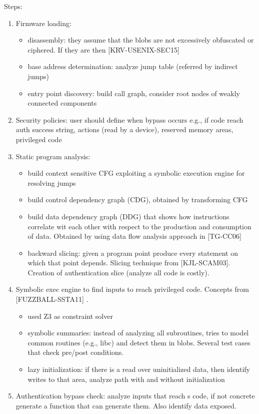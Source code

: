 \documentclass[10pt, a4paper]{article}
\begin{document}
Steps:
\begin{enumerate}
  \item Firmware loading: 
    \begin{itemize}
      \item disassembly: they assume that the blobs are not excessively obfuscated or ciphered. If they are then [KRV-USENIX-SEC15]
      \item base address determination: analyze jump table (referred by indirect jumps)
      \item entry point discovery: build call graph, consider root nodes of weakly connected components
    \end{itemize}
  \item Security policies: user should define when bypass occurs e.g., if code reach auth success string, actions (read by a device), reserved memory areas, privileged code
  \item Static program analysis:
    \begin{itemize}
      \item build context sensitive CFG exploiting a symbolic execution engine for resolving jumps
      \item build control dependency graph (CDG), obtained by transforming CFG
      \item build data dependency graph (DDG) that shows how instructions correlate wit each other with respect to the production and consumption of data. Obtained by using data flow analysis approach in [TG-CC06]
      \item backward slicing: given a program point produce every statement on which that point depends. Slicing technique from [KJL-SCAM03]. Creation of authentication slice (analyze all code is costly).
    \end{itemize}
  \item Symbolic exec engine to find inputs to reach privileged code. Concepts from~\cite{KLEE-OSDI08} [FUZZBALL-SSTA11] \cite{MAYHEM-SP12}.
    \begin{itemize}
      \item used Z3 as constraint solver
      \item symbolic summaries: instead of analyzing all subroutines, tries to model common routines (e.g., libc) and detect them in blobs. Several test cases that check pre/post conditions.
      \item lazy initialization: if there is a read over uninitialized data, then identify writes to that area, analyze path with and without initialization
    \end{itemize}
  \item  Authentication bypass check: analyze inputs that reach s code, if not concrete generate a function that can generate them. Also identify data exposed.
\end{enumerate}
\end{document}
